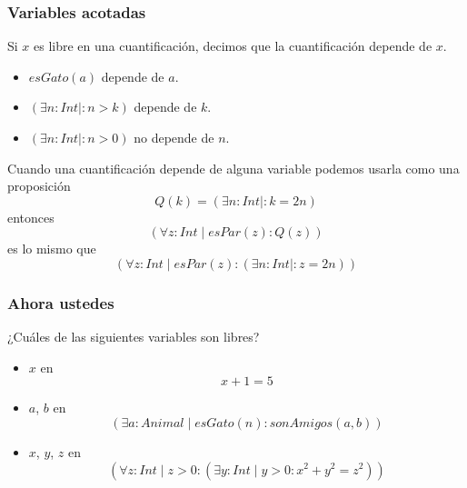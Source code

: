 \documentclass{beamer}
\begin{document}
\begin{frame}[fragile]
    \frametitle{Variables acotadas} 
    \pause
    Si $x$ es libre en una cuantificación, decimos que la cuantificación depende de $x$.
    \begin{itemize}
        \pause
        \item $esGato(a)$ depende de $a$.
        \pause
        \item $(\exists n: Int \mid : n > k)$ depende de $k$.
        \pause
        \item $(\exists n: Int \mid : n > 0)$ no depende de $n$.
    \end{itemize}
    \pause
    Cuando una cuantificación depende de alguna variable podemos usarla como una proposición
        \pause
        $$Q(k) = (\exists n: Int \mid : k = 2n)$$
    \pause
    entonces
        \pause
        $$(\forall z: Int \mid esPar(z) : Q(z))$$
    \pause
    es lo mismo que
        \pause
        $$(\forall z: Int \mid esPar(z) : (\exists n: Int \mid : z = 2n))$$
\end{frame}

\begin{frame}[fragile]
    \frametitle{Ahora ustedes}
    \pause
    ¿Cuáles de las siguientes variables son libres?
    \begin{itemize}
        \pause
        \item $x$ en
            $$x + 1 = 5$$
        \pause
        \item $a$, $b$ en 
            $$(\exists a: Animal \mid esGato(n) : sonAmigos(a,b))$$
        \pause
        \item $x$, $y$, $z$ en 
            $$(\forall z: Int \mid z > 0 : (\exists y: Int \mid y > 0 : x^2+y^2=z^2))$$
    \end{itemize}
\end{frame}
\end{document}
